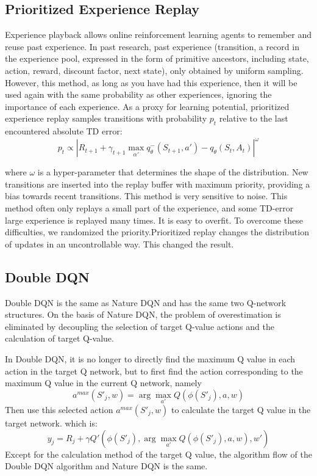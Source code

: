 \documentclass{article}
\begin{document}
\subsection{Prioritized Experience Replay}
Experience playback allows online reinforcement learning agents to remember and reuse past experience. In past research, past experience (transition, a record in the experience pool, expressed in the form of primitive ancestors, including state, action, reward, discount factor, next state), only obtained by uniform sampling. However, this method, as long as you have had this experience, then it will be used again with the same probability as other experiences, ignoring the importance of each experience.
    As a proxy for learning potential, prioritized experience replay
    samples transitions with probability $p_t$
    relative to the last encountered absolute TD error:
$$
p_t \propto \left | R_{t+1}+\gamma_{t+1} \max_{\alpha'} q_{\theta}^-(S_{t+1},a')-q_\theta(S_t, A_t) \right|^\omega
$$

where $\omega$ is a hyper-parameter that determines the shape of
the distribution. New transitions are inserted into the replay
buffer with maximum priority, providing a bias towards recent transitions. This method is very sensitive to noise. This method often only replays a small part of the experience, and some TD-error large experience is replayed many times. It is easy to overfit. To overcome these difficulties, we randomized the priority.Prioritized replay changes the distribution of updates in an uncontrollable way. This changed the result.

\subsection{Double DQN}
Double DQN is the same as Nature DQN and has the same two Q-network structures. On the basis of Nature DQN, the problem of overestimation is eliminated by decoupling the selection of target Q-value actions and the calculation of target Q-value. 

In Double DQN, it is no longer to directly find the maximum Q value in each action in the target Q network, but to first find the action corresponding to the maximum Q value in the current Q network, namely
$$
a^{max}(S'_j, w) = \arg\max_{a'}Q(\phi(S'_j),a,w)
$$
Then use this selected action $a^{max}(S'_j, w)$ to calculate the target Q value in the target network. which is:
$$
y_j = R_j + \gamma Q'(\phi(S'_j),\arg\max_{a'}Q(\phi(S'_j),a,w),w')
$$
Except for the calculation method of the target Q value, the algorithm flow of the Double DQN algorithm and Nature DQN is the same.
\end{document}
